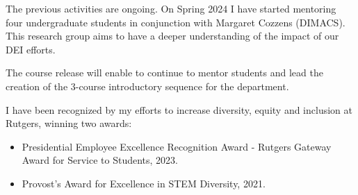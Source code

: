 \documentclass[11pt]{article}
\begin{document}
The previous activities are ongoing. On Spring 2024 I have
started mentoring four undergraduate students in conjunction with
Margaret Cozzens (DIMACS). This research group aims to have a deeper
understanding of the impact of our DEI efforts.

The course release will enable to continue to mentor students and lead
the creation of the 3-course introductory sequence for the department.

I have been recognized by my efforts to increase diversity, equity and
inclusion at Rutgers, winning two awards:

\begin{itemize}
  \item Presidential Employee Excellence Recognition Award - Rutgers Gateway Award for Service to Students, 2023. 
  \item Provost's Award for Excellence in STEM Diversity, 2021.
\end{itemize}
\end{document}
